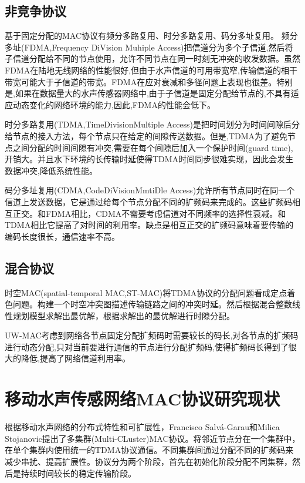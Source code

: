 \subsection{非竞争协议}
基于固定分配的MAC协议有频分多路复用、时分多路复用、码分多址复用。
频分多址(FDMA,Frequency DiVision Muhiple Access)把信道分为多个子信道,然后将子信道分配给不同的节点使用，允许不同节点在同一时刻无冲突的收发数据。虽然FDMA在陆地无线网络的性能很好,但由于水声信道的可用带宽窄,传输信道的相干带宽可能大于子信道的带宽。FDMA在应对衰减和多径问题上表现也很差。特别是,如果在数据量大的水声传感器网络中,由于子信道是固定分配给节点的,不具有适应动态变化的网络环境的能力,因此,FDMA的性能会低下。

时分多路复用(TDMA,TimeDivisionMultiple Access)是把时间划分为时间间隙后分给节点的接入方法，每个节点只在给定的间隙传送数据。但是,TDMA为了避免节点之间分配的时间间隙有冲突,需要在每个间隙后加入一个保护时间(guard time),开销大。并且水下环境的长传输时延使得TDMA时间同步很难实现，因此会发生数据冲突,降低系统性能。

码分多址复用(CDMA,CodeDiVisionMmtiDle Access)允许所有节点同时在同一个信道上发送数据，它是通过给每个节点分配不同的扩频码来完成的。这些扩频码相互正交。和FDMA相比，CDMA不需要考虑信道对不同频率的选择性衰减。和TDMA相比它提高了对时间的利用率。缺点是相互正交的扩频码意味着要传输的编码长度很长，通信速率不高。

\subsection{混合协议}
时空MAC(spatial-temporal MAC,ST-MAC)将TDMA协议的分配问题看成定点着色问题。构建一个时空冲突图描述传输链路之间的冲突时延。然后根据混合整数线性规划模型求解出最优解，根据求解出的最优解进行时隙分配。

UW-MAC考虑到网络各节点固定分配扩频码时需要较长的码长,对各节点的扩频码进行动态分配,只对当前要进行通信的节点进行分配扩频码,使得扩频码长得到了很大的降低,提高了网络信道利用率。

\section{移动水声传感网络MAC协议研究现状}
根据移动水声网络的分布式特性和可扩展性，Francisco Salvá-Garau和Milica Stojanovic提出了多集群(Multi-CLuster)\cite{Multi-Cluster Protocol for Ad Hoc Mobile Underwater Acoustic Networks Oceans2003}MAC协议。将邻近节点分在一个集群中，在单个集群内使用统一的TDMA协议通信。不同集群间通过分配不同的扩频码来减少串扰、提高扩展性。协议分为两个阶段，首先在初始化阶段分配不同集群，然后是持续时间较长的稳定传输阶段。


